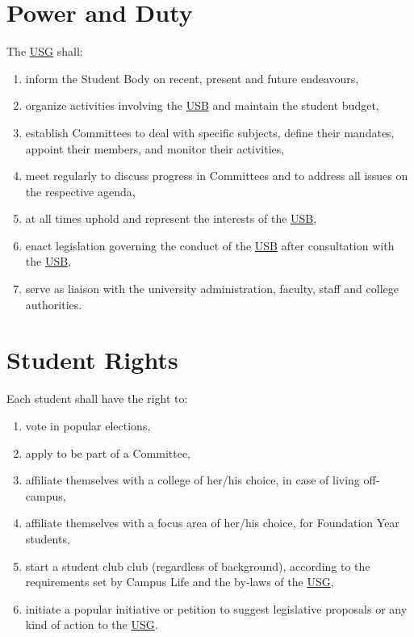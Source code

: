 \section{Power and Duty}
The \hyperref[USGdef]{USG} shall: 
\begin{enumerate}
\item inform the Student Body on recent, present and future endeavours,
\item organize activities involving the \hyperref[studentbody]{USB} and maintain the student budget,
\item establish Committees to deal with specific subjects, define their mandates, appoint their members, and monitor their activities,
\item meet regularly to discuss progress in Committees and to address all issues on the respective agenda,
\item at all times uphold and represent the interests of the \hyperref[studentbody]{USB},
\item enact legislation governing the conduct of the \hyperref[studentbody]{USB} after consultation with the \hyperref[studentbody]{USB},
\item serve as liaison with the university administration, faculty, staff and college authorities.
\end{enumerate}

\section{Student Rights}
Each student shall have the right to:
\begin{enumerate}[nosep] 
\item vote in popular elections,

\item apply to be part of a Committee,
\item affiliate themselves with a college of her/his choice, in case of living off-campus,
\item affiliate themselves with a focus area of her/his choice, for Foundation Year students,
\item start a student club  club (regardless of background), according to the requirements set by Campus Life and the by-laws of the \hyperref[USGdef]{USG},
\item initiate a popular initiative or petition to suggest legislative proposals or any kind of action to the \hyperref[USGdef]{USG}.
\end{enumerate}

